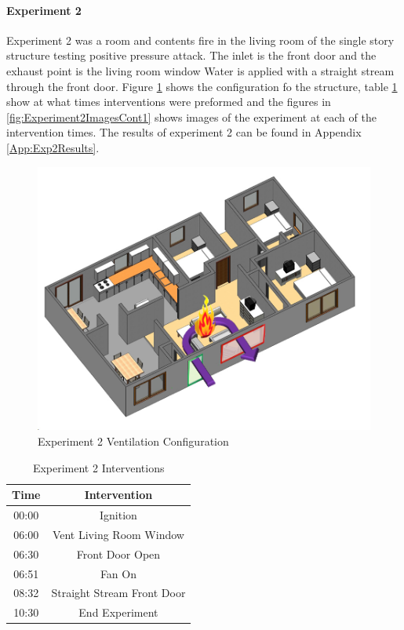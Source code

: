 \documentclass{article}
\begin{document}
\paragraph{Experiment 2}\mbox{}

Experiment 2 was a room and contents fire in the living room of the single story structure testing positive pressure attack. The inlet is the front door and the exhaust point is the living room window Water is applied with a straight stream through the front door. Figure \ref{fig:Exp2VentConfig} shows the configuration fo the structure, table \ref{Table:Exp2Interventions} show at what times interventions were preformed and the figures in \ref{fig:Experiment2ImagesCont1} shows images of the experiment at each of the intervention times. The results of experiment 2 can be found in Appendix \ref{App:Exp2Results}.

 \begin{figure}[h!]
 	\centering
 	\includegraphics[width=5in]{0_Images/FireExperiments/Single_Story/Experiment_2.jpg}
 	\caption{Experiment 2 Ventilation Configuration}
 	\label{fig:Exp2VentConfig}
 \end{figure}

\begin{table}[H]
	\centering
	\caption{Experiment 2 Interventions}
	\begin{tabular}{|c|c|} 
		\hline
		Time & Intervention \\ \hline \hline
		00:00 & Ignition \\ \hline
		06:00 & Vent Living Room Window\\ \hline
		06:30 & Front Door Open \\ \hline
		06:51 & Fan On \\ \hline
		08:32 & Straight Stream Front Door \\ \hline
		10:30 & End Experiment \\ \hline
	\end{tabular}
	\label{Table:Exp2Interventions}
\end{table}
\end{document}
